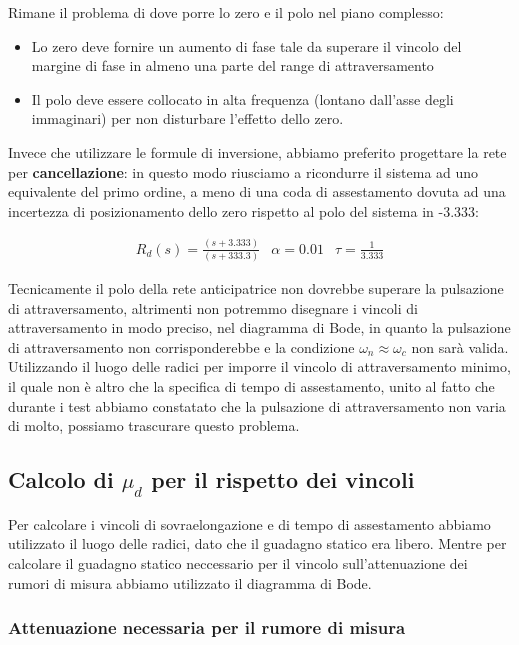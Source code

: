 \documentclass{article}
\begin{document}
Rimane il problema di dove porre lo zero e il polo nel piano complesso:
\begin{itemize}
    \item Lo zero deve fornire un aumento di fase tale da superare il vincolo del margine di fase in almeno una parte del range di attraversamento
    \item Il polo deve essere collocato in alta frequenza (lontano dall'asse degli immaginari) per non disturbare l'effetto dello zero.
\end{itemize}

Invece che utilizzare le formule di inversione, abbiamo preferito progettare la rete per \textbf{cancellazione}: in questo modo riusciamo a ricondurre il sistema ad uno equivalente del primo ordine, a meno di una coda di assestamento dovuta ad una incertezza di posizionamento dello zero rispetto al polo del sistema in -3.333:

$$
\begin{array}{lll}
    R_d(s) = \frac{(s+3.333)}{(s+333.3)} &\alpha=0.01 & \tau=\frac{1}{3.333}
\end{array}
$$

Tecnicamente il polo della rete anticipatrice non dovrebbe superare la pulsazione di attraversamento, altrimenti non potremmo disegnare i vincoli di attraversamento in modo preciso, nel diagramma di Bode, in quanto la pulsazione di attraversamento non corrisponderebbe e la condizione $\omega_n\approx\omega_c$ non sarà valida.\\

Utilizzando il luogo delle radici per imporre il vincolo di attraversamento minimo, il quale non è altro che la specifica di tempo di assestamento, unito al fatto che durante i test abbiamo constatato che la pulsazione di attraversamento non varia di molto, possiamo trascurare questo problema.

\subsection{Calcolo di $\mu_d$ per il rispetto dei vincoli}

Per calcolare i vincoli di sovraelongazione e di tempo di assestamento abbiamo utilizzato il luogo delle radici, dato che il guadagno statico era libero. Mentre per calcolare il guadagno statico neccessario per il vincolo sull'attenuazione dei rumori di misura abbiamo utilizzato il diagramma di Bode.

\subsubsection{Attenuazione necessaria per il rumore di misura}
\end{document}
